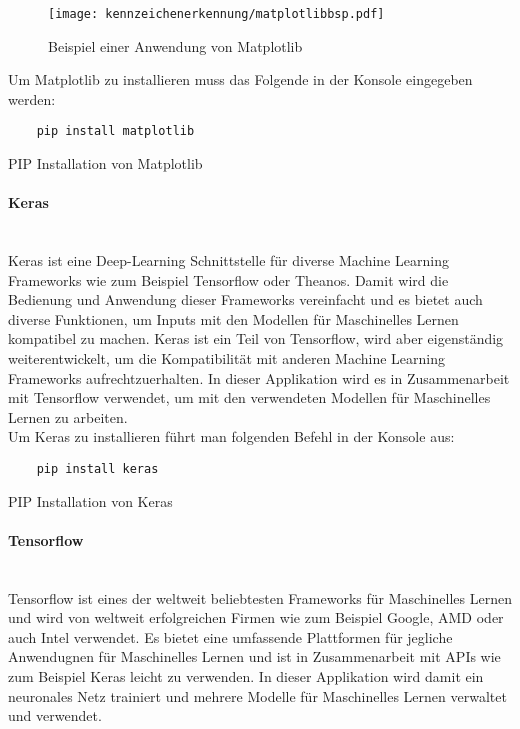 \begin{figure}[H]
    \centering
    \texttt{[image: kennzeichenerkennung/matplotlibbsp.pdf]}
    \caption{Beispiel einer Anwendung von Matplotlib}
\end{figure}

Um Matplotlib zu installieren muss das Folgende in der Konsole eingegeben werden:

\begin{listing}[H]
    \begin{verbatim}
    pip install matplotlib
    \end{verbatim}
    \caption{PIP Installation von Matplotlib}
\end{listing}

\paragraph{Keras}\mbox{}\\
Keras ist eine Deep-Learning Schnittstelle für diverse Machine Learning Frameworks wie zum Beispiel Tensorflow oder Theanos. 
Damit wird die Bedienung und Anwendung dieser Frameworks vereinfacht und es bietet auch diverse Funktionen, um Inputs mit 
den Modellen für Maschinelles Lernen kompatibel zu machen. Keras ist ein Teil von Tensorflow, wird aber eigenständig weiterentwickelt, 
um die Kompatibilität mit anderen Machine Learning Frameworks aufrechtzuerhalten. In dieser Applikation wird es in 
Zusammenarbeit mit Tensorflow verwendet, um mit den verwendeten Modellen für Maschinelles Lernen zu arbeiten.\\

Um Keras zu installieren führt man folgenden Befehl in der Konsole aus:

\begin{listing}[H]
    \begin{verbatim}
    pip install keras
    \end{verbatim}
    \caption{PIP Installation von Keras}
\end{listing}

\paragraph{Tensorflow}\mbox{}\\
Tensorflow ist eines der weltweit beliebtesten Frameworks für Maschinelles Lernen und wird von weltweit erfolgreichen Firmen wie 
zum Beispiel Google, AMD oder auch Intel verwendet. Es bietet eine umfassende Plattformen für jegliche Anwendugnen für Maschinelles Lernen 
und ist in Zusammenarbeit mit APIs wie zum Beispiel Keras leicht zu verwenden. In dieser Applikation wird damit ein neuronales 
Netz trainiert und mehrere Modelle für Maschinelles Lernen verwaltet und verwendet.\\

